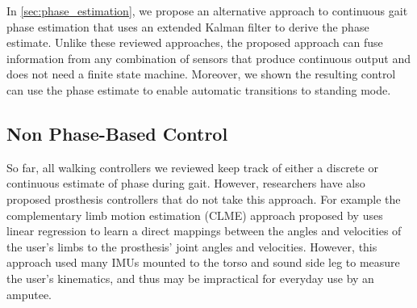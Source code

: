 In \cref{sec:phase_estimation}, we propose an alternative approach to continuous
gait phase estimation that uses an extended Kalman filter to derive the phase
estimate. Unlike these reviewed approaches, the proposed approach can fuse
information from any combination of sensors that produce continuous output and
does not need a finite state machine. Moreover, we shown the resulting control
can use the phase estimate to enable automatic transitions to standing mode. 

\subsection{Non Phase-Based Control}

So far, all walking controllers we reviewed keep track of either a discrete or
continuous estimate of phase during gait. However, researchers have also
proposed prosthesis controllers that do not take this approach. For example the
complementary limb motion estimation (CLME) approach proposed by
\citet{vallery2011complementary} uses linear regression to learn a direct
mappings between the angles and velocities of the user's limbs to the
prosthesis' joint angles and velocities. However, this approach used many IMUs
mounted to the torso and sound side leg to measure the user's kinematics, and
thus may be impractical for everyday use by an amputee.

